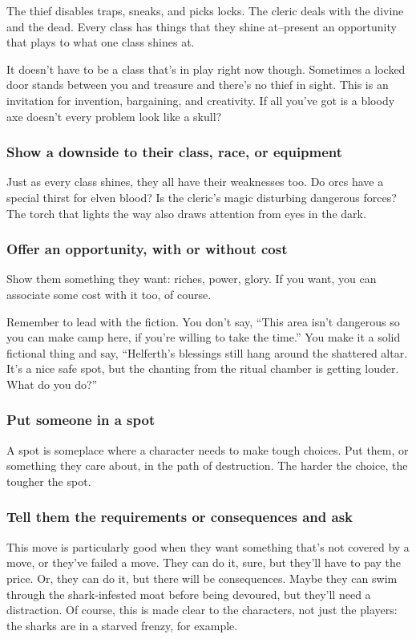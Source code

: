 The thief disables traps, sneaks, and picks locks. The cleric deals with the divine and the dead. Every class has things that they shine at--present an opportunity that plays to what one class shines at.

It doesn't have to be a class that's in play right now though. Sometimes a locked door stands between you and treasure and there's no thief in sight. This is an invitation for invention, bargaining, and creativity. If all you've got is a bloody axe doesn't every problem look like a skull?
\subsubsection{Show a downside to their class, race, or equipment}

Just as every class shines, they all have their weaknesses too. Do orcs have a special thirst for elven blood? Is the cleric's magic disturbing dangerous forces? The torch that lights the way also draws attention from eyes in the dark.
\subsubsection{Offer an opportunity, with or without cost}

Show them something they want: riches, power, glory. If you want, you can associate some cost with it too, of course.

Remember to lead with the fiction. You don't say, ``This area isn't dangerous so you can make camp here, if you're willing to take the time.'' You make it a solid fictional thing and say, ``Helferth's blessings still hang around the shattered altar. It's a nice safe spot, but the chanting from the ritual chamber is getting louder. What do you do?''
\subsubsection{Put someone in a spot}

A spot is someplace where a character needs to make tough choices. Put them, or something they care about, in the path of destruction. The harder the choice, the tougher the spot.
\subsubsection{Tell them the requirements or consequences and ask}

This move is particularly good when they want something that's not covered by a move, or they've failed a move. They can do it, sure, but they'll have to pay the price. Or, they can do it, but there will be consequences. Maybe they can swim through the shark-infested moat before being devoured, but they'll need a distraction. Of course, this is made clear to the characters, not just the players: the sharks are in a starved frenzy, for example.
